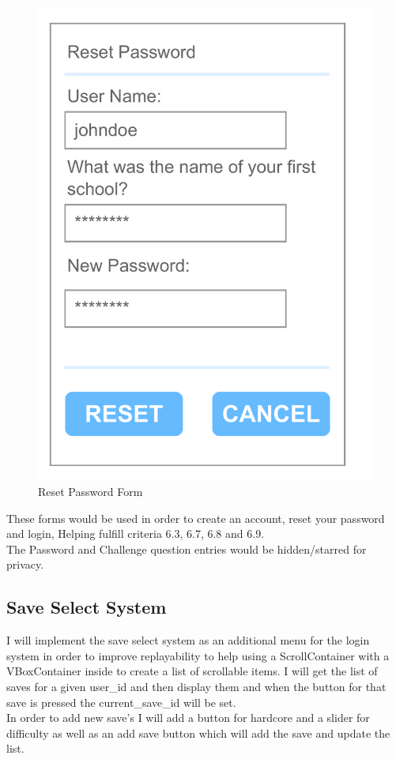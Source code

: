 \documentclass{article}
\begin{document}
\begin{multicols}{3}
\begin{figure}[H]
                        \includegraphics[width = 0.9\columnwidth]{images/design/Reset_Password.pdf}
                        \caption{Reset Password Form}
                \end{figure}
        \end{multicols}\[\]
        These forms would be used in order to create an account, reset your password and login, Helping fulfill criteria 6.3, 6.7, 6.8 and 6.9.\\
        The Password and Challenge question entries would be hidden/starred for privacy.\\
        \newpage
        \subsection{Save Select System}
        I will implement the save select system as an additional menu for the login system in order to improve replayability to help  using a ScrollContainer with a VBoxContainer inside to create a list of scrollable items. I will get the list of saves for a given user\_id and then display them and when the button for that save is pressed the current\_save\_id will be set.\\
        In order to add new save's I will add a button for hardcore and a slider for difficulty as well as an add save button which will add the save and update the list.\\
\end{document}
